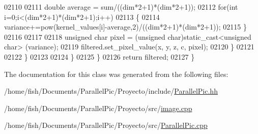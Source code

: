 \begin{DoxyCode}
02110             
02111                     \textcolor{keywordtype}{double} average =  sum/((dim*2+1)*(dim*2+1));
02112                     \textcolor{keywordflow}{for}(\textcolor{keywordtype}{int} i=0;i<(dim*2+1)*(dim*2+1);i++)
02113                     \{
02114                         variance+=pow(kernel\_values[i]-average,2)/((dim*2+1)*(dim*2+1));
02115                     \}
02116                     
02117                     
02118                     \textcolor{keywordtype}{unsigned} \textcolor{keywordtype}{char} pixel = (\textcolor{keywordtype}{unsigned} char)static\_cast<unsigned char> (variance);
02119                     filtered.set\_pixel\_value(x, y, z, c, pixel);
02120                 \}
02121                 
02122              \}
02123              
02124          \}
02125     \}  
02126      \textcolor{keywordflow}{return} filtered;
02127 \}
\end{DoxyCode}


The documentation for this class was generated from the following files\-:\begin{DoxyCompactItemize}
\item 
/home/fish/\-Documents/\-Parallel\-Pic/\-Proyecto/include/\hyperlink{_parallel_pic_8hh}{Parallel\-Pic.\-hh}\item 
/home/fish/\-Documents/\-Parallel\-Pic/\-Proyecto/src/\hyperlink{image_8cpp}{image.\-cpp}\item 
/home/fish/\-Documents/\-Parallel\-Pic/\-Proyecto/src/\hyperlink{_parallel_pic_8cpp}{Parallel\-Pic.\-cpp}\end{DoxyCompactItemize}
